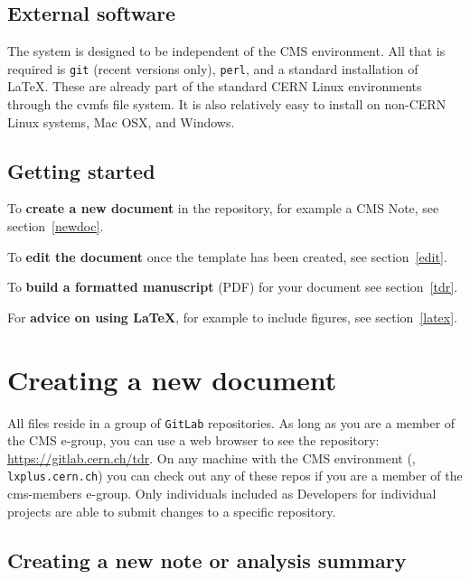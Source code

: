 \subsection{External software}
%
The system is designed to be independent of the CMS environment.
All that is required is \texttt{git} (recent versions only), \texttt{perl}, and a standard
installation of \LaTeX.
These are already part of the standard CERN Linux environments through the cvmfs file system. It is also relatively easy to install on non-CERN Linux systems, Mac OSX, and Windows.

\subsection{Getting started}

To \textbf{create a new document} in the repository, for example a CMS Note, see section~\ref{newdoc}.

To \textbf{edit the document} once the template has been created, see section~\ref{edit}.

To \textbf{build a formatted manuscript} (PDF) for your document see section~\ref{tdr}.

For \textbf{advice on using \LaTeX}, for example to include figures, see section~\ref{latex}.


\clearpage
\section{Creating a new document\label{newdoc}}


All files reside in a group of \texttt{GitLab} repositories.
As long as you are a member of the CMS e-group, you can use a web browser to see the repository: \url{https://gitlab.cern.ch/tdr}.
On any machine with the CMS environment (\eg, \texttt{lxplus.cern.ch}) you can check out any of these repos if you are a member of the cms-members e-group. Only individuals included as Developers for individual projects are able to submit changes to a specific repository.



\subsection{Creating a new note or analysis summary}

